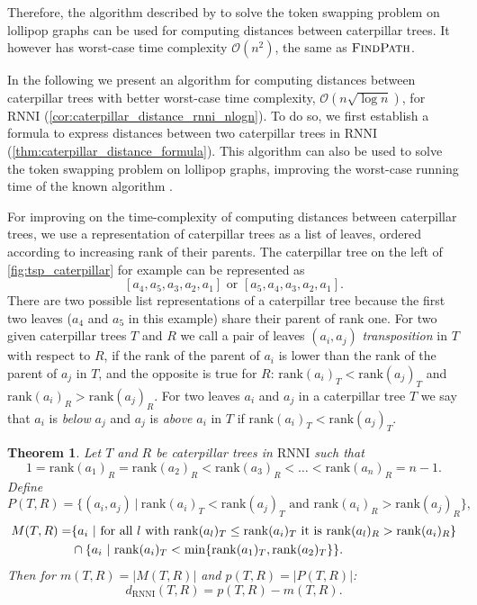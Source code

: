 \documentclass[11pt]{amsart}
\newtheorem{theorem}{Theorem}
\newcommand{\rnni}{\mathrm{RNNI}}
\newcommand{\findpath}{\textsc{FindPath}}
\newcommand{\rank}{\mathrm{rank}}
\renewcommand{\O}{\mathcal O}
\begin{document}
Therefore, the algorithm described by \textcite{Kawahara2017-ey} to solve the token swapping problem on lollipop graphs can be used for computing distances between caterpillar trees.
It however has worst-case time complexity $\O(n^2)$, the same as $\findpath$.

In the following we present an algorithm for computing distances between caterpillar trees with better worst-case time complexity, $\O(n \sqrt{\log n})$, for $\rnni$ (\autoref{cor:caterpillar_distance_rnni_nlogn}).
To do so, we first establish a formula to express distances between two caterpillar trees in $\rnni$ (\autoref{thm:caterpillar_distance_formula}).
This algorithm can also be used to solve the token swapping problem on lollipop graphs, improving the worst-case running time of the known algorithm \autocite{Kawahara2017-ey}.

For improving on the time-complexity of computing distances between caterpillar trees, we use a representation of caterpillar trees as a list of leaves, ordered according to increasing rank of their parents.
The caterpillar tree on the left of \autoref{fig:tsp_caterpillar} for example can be represented as 
\[[a_4,a_5,a_3,a_2,a_1] \text{ or }[a_5,a_4,a_3,a_2,a_1].\]
There are two possible list representations of a caterpillar tree because the first two leaves ($a_4$ and $a_5$ in this example) share their parent of rank one.
For two given caterpillar trees $T$ and $R$ we call a pair of leaves $(a_i,a_j)$ \emph{transposition} in $T$ with respect to $R$, if the rank of the parent of $a_i$ is lower than the rank of the parent of $a_j$ in $T$, and the opposite is true for $R$: $\rank(a_i)_T < \rank(a_j)_T$ and $\rank(a_i)_R > \rank(a_j)_R$.
For two leaves $a_i$ and $a_j$ in a caterpillar tree $T$ we say that $a_i$ is \emph{below} $a_j$ and $a_j$ is \emph{above} $a_i$ in $T$ if $\rank(a_i)_T < \rank(a_j)_T$.

\begin{theorem}
	\label{thm:caterpillar_distance_formula}
	Let $T$ and $R$ be caterpillar trees in $\rnni$ such that \[1 = \rank(a_1)_R = \rank(a_2)_R < \rank(a_3)_R < \ldots < \rank(a_n)_R = n-1.\]
	Define
	\[P(T,R) = \{(a_i,a_j)\ |\  \rank(a_i)_T < \rank(a_j)_T \text{ and } \rank(a_i)_R > \rank(a_j)_R\},\]
	\begin{align*}
		M(T,R) = &\{a_i\ |\  \textnormal{for all } l \textnormal{ with } \rank(a_l)_T \leq \rank(a_i)_T \textnormal{ it is } \rank(a_l)_R > \rank(a_i)_R\} \\
		& \cap \{a_i \ |\  \rank(a_i)_T < \min\{\rank(a_1)_T, \rank(a_2)_T\}\}.
	\end{align*}
	Then for ${m(T,R) = |M(T,R)|}$ and ${p(T,R) = |P(T,R)|}$:
	\[d_{\rnni}(T,R) = p(T,R) - m(T,R).\]
\end{theorem}
\end{document}
